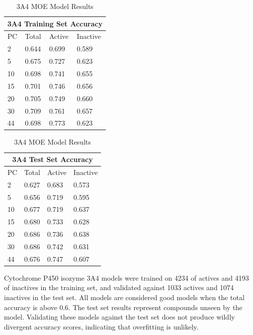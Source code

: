 \begin{table}[H]
\caption{3A4 MOE Model Results}
\begin{minipage}{.5\linewidth}
\centering
\begin{tabular}{|l|l|l|l|}
\hline
\multicolumn{4}{|c|}{3A4 Training Set Accuracy} \\ \hline
PC & Total          & Active          & Inactive \\ \hline
2  & 0.644          & 0.699           & 0.589   \\ \hline
5  & 0.675          & 0.727           & 0.623   \\ \hline
10 & 0.698          & 0.741           & 0.655   \\ \hline
15 & 0.701          & 0.746           & 0.656   \\ \hline
20 & 0.705          & 0.749           & 0.660   \\ \hline
30 & 0.709          & 0.761           & 0.657   \\ \hline
44 & 0.698          & 0.773           & 0.623   \\ \hline
\end{tabular}
\end{minipage}
\begin{minipage}{.5\linewidth}
\centering
\begin{tabular}{|l|l|l|l|}
\hline
\multicolumn{4}{|c|}{3A4 Test Set Accuracy}      \\ \hline
PC & Total          & Active          & Inactive \\ \hline
2  & 0.627          & 0.683           & 0.573    \\ \hline
5  & 0.656          & 0.719           & 0.595    \\ \hline
10 & 0.677          & 0.719           & 0.637    \\ \hline
15 & 0.680          & 0.733           & 0.628    \\ \hline
20 & 0.686          & 0.736           & 0.638    \\ \hline
30 & 0.686          & 0.742           & 0.631    \\ \hline
44 & 0.676          & 0.747           & 0.607    \\ \hline
\end{tabular}
\end{minipage}
\end{table}

Cytochrome P450 isozyme 3A4 models were trained on 4234 of actives and 4193 of inactives in the training set, and validated against 1033 actives and 1074 inactives in the test set. All models are considered good models when the total accuracy is above 0.6. The test set results represent compounds unseen by the model. Validating these models against the test set does not produce wildly divergent accuracy scores, indicating that overfitting is unlikely.

